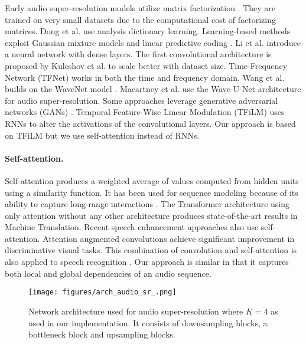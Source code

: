 \documentclass{article}
\begin{document}
Early audio super-resolution models utilize matrix factorization \cite{bansal2005bandwidth,liang2013beta}. They are trained on very small datasets due to the computational cost of factorizing matrices. Dong et al. \cite{dong2015audio} use analysis dictionary learning. Learning-based methods exploit Gaussian mixture models \cite{cheng1994statistical,pulakka2011speech,park2000narrowband} and linear predictive coding \cite{bradbury2000linear}. Li et al. \cite{li2015dnn} introduce a neural network with dense layers. The first convolutional architecture is proposed by Kuleshov et al. \cite{kuleshov2017audio} to scale better with dataset size. Time-Frequency Network (TFNet) \cite{8462049} works in both the time and frequency domain. Wang et al.\cite{wang2018speech} builds on the WaveNet model \cite{oord2016wavenet}. Macartney et al. \cite{stoller2018wave} use the  Wave-U-Net  \cite{macartney2018improved} architecture for audio super-resolution. Some approaches \cite{eskimez2019speech,hu2020phase,li2018speech,li2019speech,kumar2020nu} leverage  generative adversarial networks (GANs) \cite{goodfellow2014generative}. Temporal Feature-Wise Linear Modulation (TFiLM) \cite{birnbaum2019temporal} uses RNNs to alter the activations of the convolutional layers. Our approach is based on TFiLM but we use self-attention instead of RNNs.

\paragraph*{Self-attention.}
Self-attention produces a weighted average of values computed from hidden units using a similarity function. It has been used for sequence modeling because of its ability to capture long-range interactions \cite{bahdanau2014neural, bello2016neural}. The Transformer architecture \cite{vaswani2017attention} using only attention without any other architecture produces state-of-the-art results in Machine Translation. Recent speech enhancement approaches \cite{koizumi2020speech,hao2019attention,giri2019attention} also use self-attention. Attention augmented convolutions \cite{bello2019attention} achieve significant improvement in discriminative visual tasks. This combination of convolution and
self-attention is also applied to speech recognition \cite{gulati2020conformer}. Our approach is similar in that it captures both local and global dependencies of an audio sequence.

\begin{figure}[htb]
    \centering
    \texttt{[image: figures/arch\_audio\_sr\_.png]}
    \caption{Network architecture used for audio super-resolution where $K=4$ as used in our implementation. It consists of downsampling blocks, a bottleneck block and upsampling blocks.}
    \label{fig:arch}
\end{figure}
\end{document}
